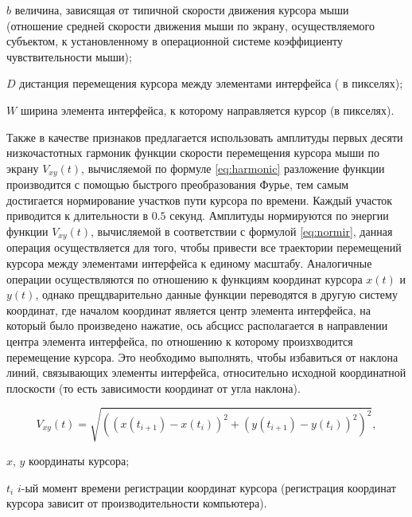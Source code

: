 \begin{eqexpl}[15mm]
\item{$b$} величина, зависящая от типичной скорости движения курсора мыши (отношение средней скорости движения мыши по экрану, осуществляемого субъектом, к установленному в операционной системе коэффициенту чувствительности мыши);
\item{$D$} дистанция перемещения курсора между элементами интерфейса ( в пикселях);
\item{$W$} ширина элемента интерфейса, к которому направляется курсор (в пикселях).
\end{eqexpl}

Также в качестве признаков предлагается использовать амплитуды первых десяти низкочастотных гармоник функции скорости перемещения курсора мыши по экрану $V_{xy}(t)$, вычисляемой по формуле \ref{eq:harmonic} разложение функции производится с помощью быстрого преобразования Фурье, тем самым достигается нормирование участков пути курсора по времени. Каждый участок приводится к длительности в $0.5$ секунд. Амплитуды нормируются по энергии функции $V_{xy}(t)$, вычисляемой в соответствии с формулой \ref{eq:normir}, данная операция осуществляется для того, чтобы привести все траектории перемещений курсора между элементами интерфейса к единому масштабу. Аналогичные операции осуществляются по отношению к функциям координат курсора $x(t)$ и $y(t)$, однако прещдварительно данные функции переводятся в другую систему координат, где началом координат является центр элемента интерфейса, на который было произведено нажатие, ось абсцисс располагается в направлении центра элемента интерфейса, по отношению к которому произхводится перемещение курсора. Это необходимо выполнять, чтобы избавиться от наклона линий, связывающих элементы интерфейса, относительно исходной координатной плоскости (то есть зависимости координат от угла наклона). \cite{mouseMethod}

\begin{equation}
\label{eq:harmonic}
V_{xy}(t) = \sqrt{((x(t_{i+1}) - x(t_i))^2 + (y(t_{i+1})-y(t_i))^2)^2},
\end{equation}

\begin{eqexpl}[15mm]
\item{$x$, $y$} координаты курсора;
\item{$t_i$} $i$-ый момент времени регистрации координат курсора (регистрация координат курсора зависит от производительности компьютера).
\end{eqexpl}

